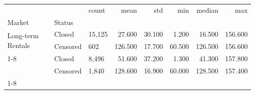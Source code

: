 \begin{tabular}{lllrrrrr}
\toprule
 &  & count & mean & std & min & median & max \\
Market & Status &  &  &  &  &  &  \\
\midrule
\multirow[t]{2}{*}{Long-term Rentals} & Closed & 15,125 & 27.600 & 30.100 & 1.200 & 16.500 & 156.600 \\
 & Censored & 602 & 126.500 & 17.700 & 60.500 & 126.500 & 156.600 \\
\cline{1-8}
\multirow[t]{2}{*}{Secondary Sales} & Closed & 8,496 & 51.600 & 37.200 & 1.300 & 41.300 & 157.800 \\
 & Censored & 1,840 & 128.600 & 16.900 & 60.000 & 128.500 & 157.400 \\
\cline{1-8}
\bottomrule
\end{tabular}
